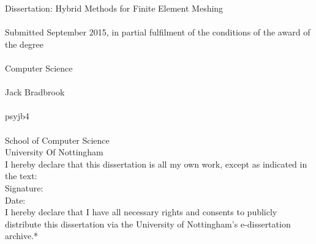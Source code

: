 \documentclass{article}
\begin{document}

\noindent
Dissertation: Hybrid Methods for Finite Element Meshing \\ \\
Submitted September 2015, in partial fulfilment of
the conditions of the award of the degree \\ \\
Computer Science \\ \\
Jack Bradbrook \\ \\
psyjb4 \\ \\
School of Computer Science \\
University Of Nottingham \\ 

\noindent
I hereby declare that this dissertation is all my own work, except as indicated
in the text: \\ 

\noindent
Signature: \\ 

\noindent
Date: \\ 


\noindent
I hereby declare that I have all necessary rights and consents  to publicly
distribute this dissertation via the University of Nottingham's e-dissertation
archive.*
\tableofcontents

\newpage















\end{document}
